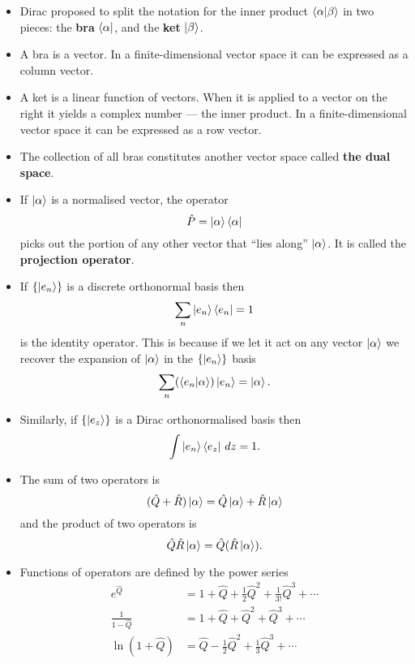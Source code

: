 \documentclass{article}
\begin{document}
\begin{itemize}
  \item Dirac proposed to split the notation for the inner product $\braket{\alpha | \beta}$ in two pieces: the \textbf{bra} $\bra{\alpha}$, and the \textbf{ket} $\ket{\beta}$.

  \item A bra is a vector. In a finite-dimensional vector space it can be expressed as a column vector.

  \item A ket is a linear function of vectors. When it is applied to a vector on the right it yields a complex number — the inner product. In a finite-dimensional vector space it can be expressed as a row vector.

  \item The collection of all bras constitutes another vector space called \textbf{the dual space}.

  \item If $\ket{\alpha}$ is a normalised vector, the operator \[\hat{P} = \ket{\alpha} \bra{\alpha}\] picks out the portion of any other vector that ``lies along'' $\ket{\alpha}$. It is called the \textbf{projection operator}.

  \item If $\{\ket{e_n}\}$ is a discrete orthonormal basis then \[\sum_n \ket{e_n} \bra{e_n} = 1\] is the identity operator. This is because if we let it act on any vector $\ket{\alpha}$ we recover the expansion of $\ket{\alpha}$ in the $\{\ket{e_n}\}$ basis \[\sum_n (\braket{e_n | \alpha}) \ket{e_n} = \ket{\alpha}.\]

  \item Similarly, if $\{\ket{e_z}\}$ is a Dirac orthonormalised basis then \[\int \ket{e_n} \bra{e_z} \,d z = 1.\]

  \item The sum of two operators is \[(\hat{Q} + \hat{R}) \ket{\alpha} = \hat{Q} \ket{\alpha} + \hat{R} \ket{\alpha}\] and the product of two operators is \[\hat{Q} \hat{R} \ket{\alpha} = \hat{Q} (\hat{R} \ket{\alpha}).\]

  \item Functions of operators are defined by the power series \begin{align*}
          e^{\hat{Q}}           & = 1 + \hat{Q} + \frac{1}{2} \hat{Q}^2 + \frac{1}{3!} \hat{Q}^3 + \cdots \\
          \frac{1}{1 - \hat{Q}} & = 1 + \hat{Q} + \hat{Q}^2 + \hat{Q}^3 + \cdots                          \\
          \ln (1 + \hat{Q})     & = \hat{Q} - \frac{1}{2} \hat{Q}^2 + \frac{1}{3} \hat{Q}^3 + \cdots
        \end{align*}
\end{itemize}
\end{document}
